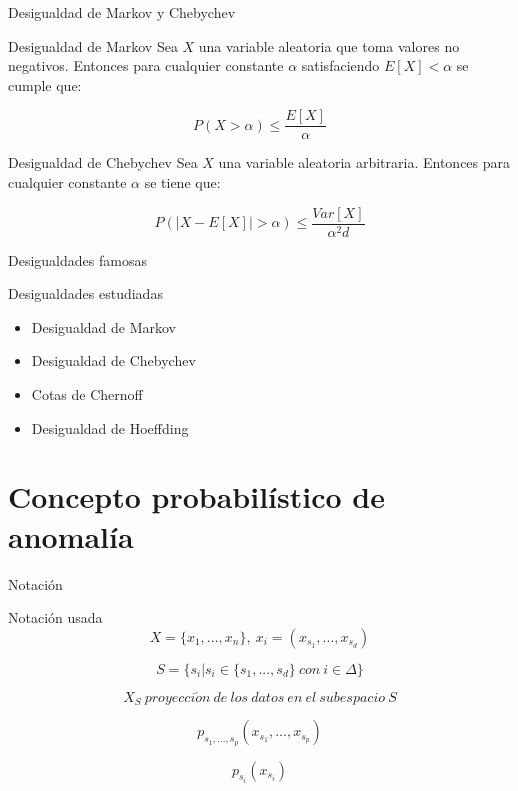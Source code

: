 \documentclass[10pt]{beamer}
\begin{document}
\begin{frame}[fragile]{Desigualdad de Markov y Chebychev}
\vspace{10px}
\pause
{}

\begin{block}{Desigualdad de Markov}
	Sea $X$ una variable aleatoria que toma valores no negativos. Entonces para cualquier constante $\alpha$ satisfaciendo $E[X]<\alpha$ se cumple que:
	
	$$P(X>\alpha)\leq \frac{E[X]}{\alpha}$$
\end{block}

\begin{block}{Desigualdad de Chebychev}
	Sea $X$ una variable aleatoria arbitraria. Entonces para cualquier constante $\alpha$ se tiene que:
	
	$$P(|X - E[X]|>\alpha)\leq \frac{Var[X]}{\alpha^2d}$$
\end{block}

\end{frame}

\begin{frame}[fragile]{Desigualdades famosas}
\vspace{10px}
\pause
{}

\begin{block}{Desigualdades estudiadas}
	\begin{itemize}
		\item Desigualdad de Markov
		\item Desigualdad de Chebychev
		\item Cotas de Chernoff
		\item Desigualdad de Hoeffding
	\end{itemize}
\end{block}

\end{frame}

\section{Concepto probabilístico de anomalía}

\begin{frame}[fragile]{Notación}
\vspace{10px}
\pause
{}

\begin{block}{Notación usada}
	$$X = \{ x_1 , ... , x_n \}, \ x_i = (x_{s_1} , ... , x_{s_d})$$
	
	\pause
	
	$$S = \{ s_i | s_i \in \{ s_1 , ... , s_d \} \ con \ i\in \Delta \}$$
	
	\pause
	
	$$X_S \ proyecci\acute{o}n \ de \ los \ datos \ en \ el \ subespacio \ S$$
	
	\pause
	
	$$p_{s_1 , ... , s_p}(x_{s_1} , ... , x_{s_p})$$
	
	\pause
	
	$$p_{s_i}(x_{s_i})$$
\end{block}

\end{frame}
\end{document}
